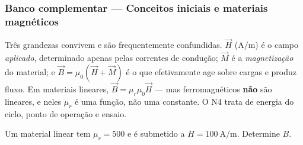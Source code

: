 
\subsubsection*{Banco complementar --- Conceitos iniciais e materiais magnéticos}

\begin{atencao}
Três grandezas convivem e são frequentemente confundidas. $\vec H$
($\si{\ampere\per\meter}$) é o campo \emph{aplicado}, determinado apenas pelas
correntes de condução; $\vec M$ é a \emph{magnetização} do material; e
$\vec B=\mu_0(\vec H+\vec M)$ é o que efetivamente age sobre cargas e produz
fluxo. Em materiais lineares, $\vec B=\mu_r\mu_0\vec H$ --- mas ferromagnéticos
\textbf{não} são lineares, e neles $\mu_r$ é uma função, não uma constante. O N4
trata de energia do ciclo, ponto de operação e ensaio.
\end{atencao}

\blocofixacao

\begin{questao}[1]{}
Um material linear tem $\mu_r=500$ e é submetido a
$H=\SI{100}{\ampere\per\meter}$. Determine $B$.
\end{questao}

